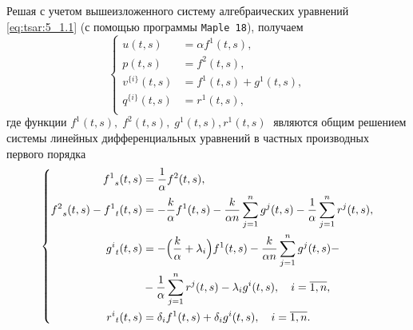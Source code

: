 Решая  с учетом вышеизложенного  систему алгебраических уравнений \eqref{eq:tsar:5_1.1} 
(с помощью программы {\tt Maple 18}), получаем
\begin{equation}
\left\{
\begin{aligned}
u(t,s) &= \alpha {f^{1}}(t,s), \\
p(t,s) &= {f^{2}}(t,s),\\
v^{\{i\}}(t,s) &= {f^{1}}(t,s) + {g^{1}}(t,s),\\
q^{\{i\}}(t,s) &= {r^{1}}(t,s),\\
\end{aligned}
\right. \label{eq:tsar:5_5_1}
\end{equation}
где функции ${f^1}(t,s),\; {f^2}(t,s),\; {g^{1}}(t,s), {r^{1}}(t,s)\; $ являются общим решением системы 
линейных дифференциальных уравнений в частных производных первого порядка
\begin{equation}
\left\{
\begin{aligned}
{f^1}_s(t,s) &= \frac{1}{\alpha} {f^2}(t,s),\\
{f^2}_s(t,s) - {f^1}_t(t,s) &= - \frac{k}{\alpha} {f^1}(t,s)
							  - \frac{k}{\alpha n} \sum_{j=1}^{n} {g^{j}}(t,s)
							  - \frac{1}{\alpha} \sum_{j=1}^{n} {r^{j}}(t,s), \\
{g^{i}}_t(t,s) &= -\Bigl( \frac{k}{\alpha} + \lambda_i \Bigr) {f^1}(t,s)
				- \frac{k}{\alpha n} \sum_{j=1}^{n} {g^{j}}(t,s) -
				\\&
				- \frac{1}{\alpha} \sum_{j=1}^{n} {r^{j}}(t,s)
				-\lambda_i {g^{i}}(t,s)
				, \quad i = \overline{ 1,n }
				,\\
{r^{i}}_t(t,s) &= \delta_i {f^1}(t,s)
				+ \delta_i {g^{i}}(t,s)
				, \quad i = \overline{ 1,n }
				.\\
\end{aligned}
\right. \label{eq:tsar:6_5_1}
\end{equation}

\smallskip

